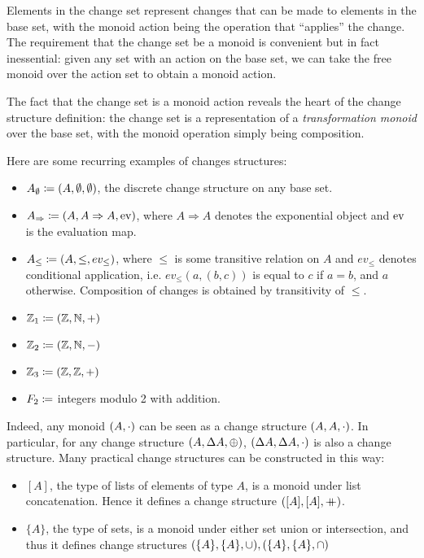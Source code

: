 Elements in the change set represent changes that can be made to elements in the
base set, with the monoid action being the operation that ``applies'' the
change. The requirement that the change set be a monoid is convenient but in
fact inessential: given any set with an action on the base set, we can take the
free monoid over the action set to obtain a monoid action.

The fact that the change set is a monoid action reveals the heart of the
change structure definition: the change set is a representation of a
\textit{transformation monoid} over the base set, with the monoid
operation simply being composition.

Here are some recurring examples of changes structures:
\begin{itemize}
  \item $A_\emptyset \coloneqq (A,\emptyset,\emptyset)$, the discrete change structure on any base set.
  \item $A_\Rightarrow \coloneqq (A,A\Rightarrow A,\operatorname{ev})$, where $A
    \Rightarrow A$ denotes the exponential object and $\operatorname{ev}$ is the evaluation map.
  \item $A_\leq \coloneqq (A,\leq,ev_\leq)$, where $\leq$ is some
    transitive relation on $A$ and $ev_\leq$ denotes
    conditional application, i.e. $ev_\leq(a, (b, c))$ is equal to $c$ if $a = b$, and $a$ otherwise. Composition of changes is obtained
    by transitivity of $\leq$.
  \item $\mathbb{Z}_1 \coloneqq (\mathbb{Z},\mathbb{N},+)$
  \item $\mathbb{Z}_2 \coloneqq (\mathbb{Z},\mathbb{N},-)$
  \item $\mathbb{Z}_3 \coloneqq (\mathbb{Z},\mathbb{Z},+)$
  \item $F_2 \coloneqq$ integers modulo 2 with addition.
\end{itemize}
Indeed, any monoid $(A, \cdot)$ can be seen as a change structure $(A,A,\cdot)$. In particular,
for any change structure $(A,\Delta A,\oplus)$,
$(\Delta A,\Delta A,\cdot)$ is also a change structure. Many practical change structures
can be constructed in this way:
\begin{itemize}
  \item $[A]$, the type of lists of elements of type $A$, is a monoid under
  list concatenation. Hence it defines a change structure $([A],[A],\mathbin{+\mkern-10mu+})$.
  \item $\{A\}$, the type of sets, is a monoid under either set union or intersection,
  and thus it defines change structures $(\{A\},\{A\},\cup),(\{A\},\{A\},\cap)$
\end{itemize}

